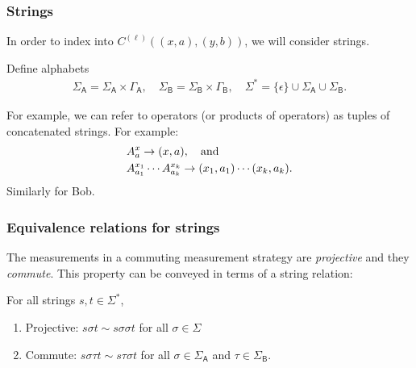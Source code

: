 \documentclass{beamer}
\def \GammaA{\Gamma_{\reg{A}}}
\def \GammaB{\Gamma_{\reg{B}}}
\def \SigmaA{\Sigma_{\reg{A}}}
\def \SigmaB{\Sigma_{\reg{B}}}
\def \DeltaA{\Sigma_{\reg{A}}}
\def \DeltaB{\Sigma_{\reg{B}}}
\newcommand{\reg}[1]{\mathsf{#1}}
\begin{document}
\begin{frame}
	\frametitle{Strings}
	In order to index into $C^{(\ell)}((x,a),(y,b))$, we will consider strings. 
	\vspace{5mm}
		
	Define alphabets 
	\begin{align*}
		\DeltaA = \SigmaA \times \GammaA, \quad \DeltaB = \SigmaB \times \GammaB, \quad \Sigma^* = \{\epsilon\} \cup \DeltaA \cup \DeltaB. 
	\end{align*}

For example, we can refer to operators (or products of operators) as tuples of concatenated strings. For example:
\begin{equation}
	\begin{aligned}
		&A_a^x \rightarrow (x,a), \quad \textnormal{and} \nonumber \\
		&A_{a_1}^{x_1} \cdots A_{a_k}^{x_k} \rightarrow (x_1,a_1) \cdots (x_k,a_k). \nonumber
	\end{aligned}
\end{equation}
Similarly for Bob.

\end{frame}

\begin{frame}
	\frametitle{Equivalence relations for strings}
The measurements in a commuting measurement strategy are \emph{projective} and they \emph{commute}. This property can be conveyed in terms of a string relation:
	\vspace{5mm}
	
	For all strings $s,t \in \Sigma^*$, 
	\begin{enumerate}
		\item Projective: $s \sigma t \sim s \sigma \sigma t$ for all $\sigma \in \Sigma$
		\item Commute: $s \sigma \tau t \sim s \tau \sigma t$ for all $\sigma \in \DeltaA$ and $\tau \in \DeltaB$. 
	\end{enumerate}
\end{frame}
\end{document}

